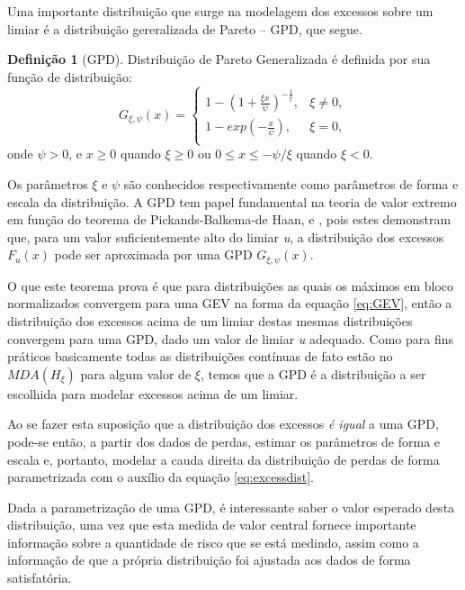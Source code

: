 \documentclass[1p]{elsarticle}
\theoremstyle{definition}
\newtheorem{defi}[teor]{Definição}
\begin{document}
Uma importante distribuição que surge na modelagem dos excessos sobre um limiar é a distribuição gereralizada de Pareto – GPD, que segue.

\begin{defi}[GPD] \label{defi:GPD}
	Distribuição de Pareto Generalizada é definida por sua função de distribuição:
	\begin{equation}
	\label{eq:GPD}
	G_{\xi,\psi}(x) = 
	\begin{cases}
	1- \left(1+ \frac{\xi x}{\psi} \right)^{-\frac{1}{\xi}}, & \xi \neq 0,\\
	1-exp\left(-\frac{x}{\psi}\right), & \xi = 0,\\
	\end{cases}
	\end{equation}
	onde $\psi > 0$, e $x\geq 0$ quando $\xi  \geq 0$ ou $0 \leq x \leq -\psi / \xi$ quando $\xi < 0$.
\end{defi}

Os parâmetros $\xi$ e $\psi$ são conhecidos respectivamente como parâmetros de forma e escala da distribuição. A GPD tem papel fundamental na teoria de valor extremo em função do teorema de Pickands-Balkema-de Haan, \cite{Pickands1975} e \cite{Balkema1974}, pois estes demonstram que, para um valor suficientemente alto do limiar \emph{u}, a distribuição dos excessos $F_u(x)$ pode ser aproximada por uma GPD $G_{\xi,\psi}(x)$.

O que este teorema prova é que para distribuições as quais os máximos em bloco normalizados convergem para uma GEV na forma da equação \eqref{eq:GEV}, então a distribuição dos excessos acima de um limiar destas mesmas distribuições convergem para uma GPD, dado um valor de limiar \emph{u} adequado. Como para fins práticos basicamente todas as distribuições contínuas de fato estão no $MDA(H_\xi)$ para algum valor de $\xi$, temos que a GPD é a distribuição a ser escolhida para modelar excessos acima de um limiar.

Ao se fazer esta suposição que a distribuição dos excessos \emph{é igual} a uma GPD, pode-se então, a partir dos dados de perdas, estimar os parâmetros de forma e escala e, portanto, modelar a cauda direita da distribuição de perdas de forma parametrizada com o auxílio da equação \eqref{eq:excessdist}. 


Dada a parametrização de uma GPD, é interessante saber o valor esperado desta distribuição, uma vez que esta medida de valor central fornece importante informação sobre a quantidade de risco que se está medindo, assim como a informação de que a própria distribuição foi ajustada aos dados de forma satisfatória.
\end{document}
